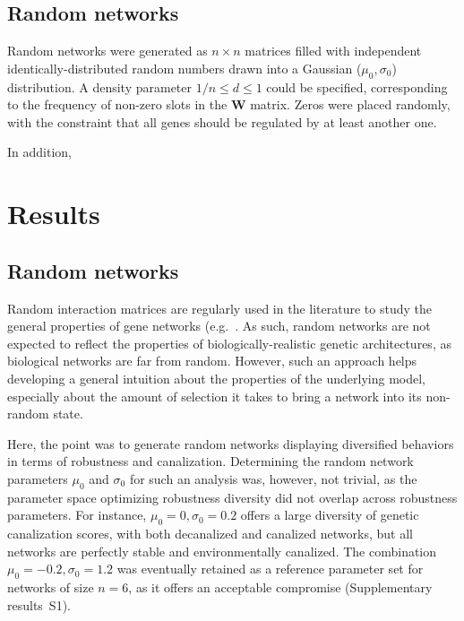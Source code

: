 \documentclass{article}
\begin{document}
\subsection{Random networks}

Random networks were generated as $n\times n$ matrices filled with independent identically-distributed random numbers drawn into a Gaussian ($\mu_0, \sigma_0$) distribution. A density parameter $1/n \leq d \leq 1$ could be specified, corresponding to the frequency of non-zero slots in the $\bm W$ matrix. Zeros were placed randomly, with the constraint that all genes should be regulated by at least another one. 

In addition, 

\section{Results}

\subsection{Random networks}

Random interaction matrices are regularly used in the literature to study the general properties of gene networks (e.g.\ \cite{CTH11,PBF12}. As such, random networks are not expected to reflect the properties of biologically-realistic genetic architectures, as biological networks are far from random. However, such an approach helps developing a general intuition about the properties of the underlying model, especially about the amount of selection it takes to bring a network into its non-random state. 

Here, the point was to generate random networks displaying diversified behaviors in terms of robustness and canalization. Determining the random network parameters $\mu_0$ and $\sigma_0$ for such an analysis was, however, not trivial, as the parameter space optimizing robustness diversity did not overlap across robustness parameters. For instance, $\mu_0=0, \sigma_0=0.2$ offers a large diversity of genetic canalization scores, with both decanalized and canalized networks, but all networks are perfectly stable and environmentally canalized. The combination $\mu_0 = -0.2, \sigma_0 = 1.2$ was eventually retained as a reference parameter set for networks of size $n=6$, as it offers an acceptable compromise (Supplementary results~S1). 
\end{document}
